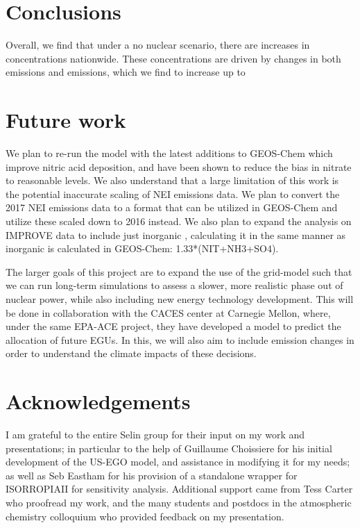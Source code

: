 \documentclass[12]{article}
\begin{document}
\section{Conclusions}
Overall, we find that under a no nuclear scenario, there are increases in  concentrations nationwide. These concentrations are driven by changes in both  emissions and  emissions, which we find to increase up to 

\section{Future work}
We plan to re-run the model with the latest additions to GEOS-Chem which improve nitric acid deposition, and have been shown to reduce the bias in nitrate to reasonable levels. We also understand that a large limitation of this work is the potential inaccurate scaling of NEI emissions data. We plan to convert the 2017 NEI emissions data to a format that can be utilized in GEOS-Chem and utilize these scaled down to 2016 instead. We also plan to expand the analysis on IMPROVE data to include just inorganic , calculating it in the same manner as inorganic  is calculated in GEOS-Chem: 1.33*(NIT+NH3+SO4). 

The larger goals of this project are to expand the use of the grid-model such that we can run long-term simulations to assess a slower, more realistic phase out of nuclear power, while also including new energy technology development. This will be done in collaboration with the CACES center at Carnegie Mellon, where, under the same EPA-ACE project, they have developed a model to predict the allocation of future EGUs. In this, we will also aim to include  emission changes in order to understand the climate impacts of these decisions.

\section{Acknowledgements}
I am grateful to the entire Selin group for their input on my work and presentations; in particular to the help of Guillaume Choissiere for his initial development of the US-EGO model, and assistance in modifying it for my needs; as well as Seb Eastham for his provision of a standalone wrapper for ISORROPIAII for sensitivity analysis. Additional support came from Tess Carter who proofread my work, and the many students and postdocs in the atmospheric chemistry colloquium who provided feedback on my presentation. 

\pagebreak


\end{document}
